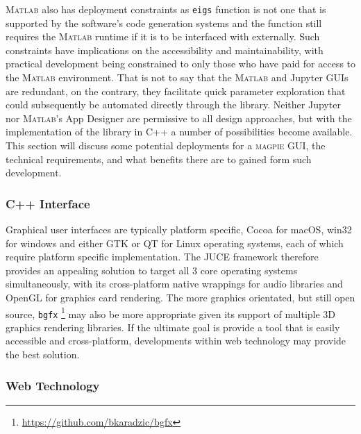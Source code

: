 M\textsc{atlab} also has deployment constraints as \texttt{eigs} function is not
one that is supported by the software's code generation systems and the function
still requires the M\textsc{atlab} runtime if it is to be interfaced with
externally. Such constraints have implications on the accessibility and
maintainability, with practical development being constrained to only those who
have paid for access to the M\textsc{atlab} environment. That is not to say that
the M\textsc{atlab} and Jupyter GUIs are redundant, on the contrary, they
facilitate quick parameter exploration that could subsequently be automated
directly through the library. Neither Jupyter nor M\textsc{atlab}'s App Designer
are permissive to all design approaches, but with the implementation of the
library in C++ a number of possibilities become available. This section will
discuss some potential deployments for a \textsc{magpie} GUI, the technical
requirements, and what benefits there are to gained form such development.

\subsubsection{C++ Interface}

Graphical user interfaces are typically platform specific, Cocoa for macOS,
win32 for windows and either GTK or QT for Linux operating systems, each of
which require platform specific implementation. The JUCE framework therefore
provides an appealing solution to target all 3 core operating systems
simultaneously, with its cross-platform native wrappings for audio libraries and
OpenGL for graphics card rendering. The more graphics orientated, but still open
source, \texttt{bgfx}%
\footnote{\url{https://github.com/bkaradzic/bgfx}} may also be more appropriate
given its support of multiple 3D graphics rendering libraries. If the ultimate
goal is provide a tool that is easily accessible and cross-platform,
developments within web technology may provide the best solution.

\subsubsection{Web Technology}\label{sec:wasm}

